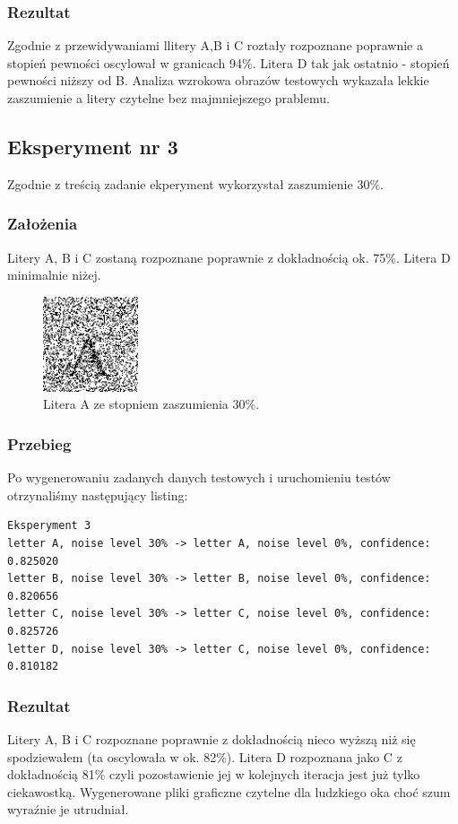 \documentclass[12pt]{article}
\begin{document}
\subsubsection{Rezultat}
Zgodnie z przewidywaniami llitery A,B i C roztały rozpoznane poprawnie a stopień pewności oscylował w granicach 94\%. Litera D tak jak ostatnio - stopień pewności niższy od B. Analiza wzrokowa obrazów testowych wykazała lekkie zaszumienie a litery czytelne bez majmniejszego prablemu.\\

\subsection{Eksperyment nr 3}
Zgodnie z treścią zadanie ekperyment wykorzystał zaszumienie 30\%.
\subsubsection{Założenia}
Litery A, B i C zostaną rozpoznane poprawnie z dokładnością ok. 75\%. Litera D minimalnie niżej.
\begin{figure}[h]
    \centering
    \includegraphics[width=0.25\textwidth]{A_30.png}
    \caption{Litera A ze stopniem zaszumienia 30\%.}
    \label{fig:A_30}
\end{figure}
\subsubsection{Przebieg}
Po wygenerowaniu zadanych danych testowych i uruchomieniu testów otrzynaliśmy następujący listing:
\begin{verbatim}
Eksperyment 3
letter A, noise level 30% -> letter A, noise level 0%, confidence: 0.825020
letter B, noise level 30% -> letter B, noise level 0%, confidence: 0.820656
letter C, noise level 30% -> letter C, noise level 0%, confidence: 0.825726
letter D, noise level 30% -> letter C, noise level 0%, confidence: 0.810182
\end{verbatim}

\subsubsection{Rezultat}
Litery A, B i C rozpoznane poprawnie z dokładnością nieco wyższą niż się spodziewałem (ta oscylowała w ok. 82\%). Litera D rozpoznana jako C z dokładnością 81\% czyli pozostawienie jej w kolejnych iteracja jest już tylko ciekawostką. Wygenerowane pliki graficzne czytelne dla ludzkiego oka choć szum wyraźnie je utrudniał.\\
\end{document}

